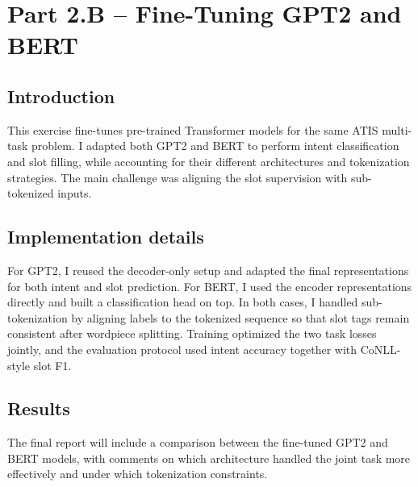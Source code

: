 \section{Part 2.B -- Fine-Tuning GPT2 and BERT}

\subsection{Introduction}
This exercise fine-tunes pre-trained Transformer models for the same ATIS multi-task problem. I adapted both GPT2 and BERT to perform intent classification and slot filling, while accounting for their different architectures and tokenization strategies. The main challenge was aligning the slot supervision with sub-tokenized inputs.

\subsection{Implementation details}
For GPT2, I reused the decoder-only setup and adapted the final representations for both intent and slot prediction. For BERT, I used the encoder representations directly and built a classification head on top. In both cases, I handled sub-tokenization by aligning labels to the tokenized sequence so that slot tags remain consistent after wordpiece splitting. Training optimized the two task losses jointly, and the evaluation protocol used intent accuracy together with CoNLL-style slot F1.

\subsection{Results}
The final report will include a comparison between the fine-tuned GPT2 and BERT models, with comments on which architecture handled the joint task more effectively and under which tokenization constraints.
